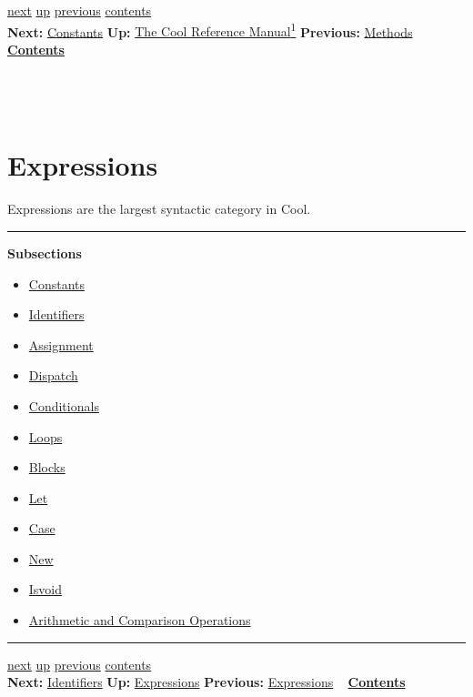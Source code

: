 \documentclass[]{article}
\begin{document}
\href{node14.html}{next} \href{cool-manual.html}{up}
\href{node12.html}{previous} \href{node1.html}{contents} \\
\textbf{Next:} \href{node14.html}{Constants} \textbf{Up:}
\href{cool-manual.html}{The Cool Reference Manual\textsuperscript{1}}
\textbf{Previous:} \href{node12.html}{Methods} ~
\textbf{\href{node1.html}{Contents}} \\ \\

\section{\\ Expressions}

Expressions are the largest syntactic category in Cool. \\

\begin{center}\rule{3in}{0.4pt}\end{center}

\textbf{Subsections}

\begin{itemize}
\itemsep1pt\parskip0pt
\item
  \href{node14.html}{Constants}
\item
  \href{node15.html}{Identifiers}
\item
  \href{node16.html}{Assignment}
\item
  \href{node17.html}{Dispatch}
\item
  \href{node18.html}{Conditionals}
\item
  \href{node19.html}{Loops}
\item
  \href{node20.html}{Blocks}
\item
  \href{node21.html}{Let}
\item
  \href{node22.html}{Case}
\item
  \href{node23.html}{New}
\item
  \href{node24.html}{Isvoid}
\item
  \href{node25.html}{Arithmetic and Comparison Operations}
\end{itemize}

\begin{center}\rule{3in}{0.4pt}\end{center}

\href{node15.html}{next} \href{node13.html}{up}
\href{node13.html}{previous} \href{node1.html}{contents} \\
\textbf{Next:} \href{node15.html}{Identifiers} \textbf{Up:}
\href{node13.html}{Expressions} \textbf{Previous:}
\href{node13.html}{Expressions} ~ \textbf{\href{node1.html}{Contents}}
\\ \\
\end{document}
